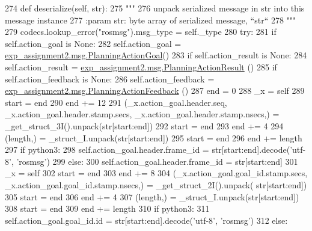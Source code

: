 \begin{DoxyCode}
274   \textcolor{keyword}{def }deserialize(self, str):
275     \textcolor{stringliteral}{"""}
276 \textcolor{stringliteral}{    unpack serialized message in str into this message instance}
277 \textcolor{stringliteral}{    :param str: byte array of serialized message, ``str``}
278 \textcolor{stringliteral}{    """}
279     codecs.lookup\_error(\textcolor{stringliteral}{"rosmsg"}).msg\_type = self.\_type
280     \textcolor{keywordflow}{try}:
281       \textcolor{keywordflow}{if} self.action\_goal \textcolor{keywordflow}{is} \textcolor{keywordtype}{None}:
282         self.action\_goal = \hyperlink{classexp__assignment2_1_1msg_1_1__PlanningActionGoal_1_1PlanningActionGoal}{exp\_assignment2.msg.PlanningActionGoal}()
283       \textcolor{keywordflow}{if} self.action\_result \textcolor{keywordflow}{is} \textcolor{keywordtype}{None}:
284         self.action\_result = \hyperlink{classexp__assignment2_1_1msg_1_1__PlanningActionResult_1_1PlanningActionResult}{exp\_assignment2.msg.PlanningActionResult}
      ()
285       \textcolor{keywordflow}{if} self.action\_feedback \textcolor{keywordflow}{is} \textcolor{keywordtype}{None}:
286         self.action\_feedback = \hyperlink{classexp__assignment2_1_1msg_1_1__PlanningActionFeedback_1_1PlanningActionFeedback}{exp\_assignment2.msg.PlanningActionFeedback}
      ()
287       end = 0
288       \_x = self
289       start = end
290       end += 12
291       (\_x.action\_goal.header.seq, \_x.action\_goal.header.stamp.secs, \_x.action\_goal.header.stamp.nsecs,) = 
      \_get\_struct\_3I().unpack(str[start:end])
292       start = end
293       end += 4
294       (length,) = \_struct\_I.unpack(str[start:end])
295       start = end
296       end += length
297       \textcolor{keywordflow}{if} python3:
298         self.action\_goal.header.frame\_id = str[start:end].decode(\textcolor{stringliteral}{'utf-8'}, \textcolor{stringliteral}{'rosmsg'})
299       \textcolor{keywordflow}{else}:
300         self.action\_goal.header.frame\_id = str[start:end]
301       \_x = self
302       start = end
303       end += 8
304       (\_x.action\_goal.goal\_id.stamp.secs, \_x.action\_goal.goal\_id.stamp.nsecs,) = \_get\_struct\_2I().unpack(
      str[start:end])
305       start = end
306       end += 4
307       (length,) = \_struct\_I.unpack(str[start:end])
308       start = end
309       end += length
310       \textcolor{keywordflow}{if} python3:
311         self.action\_goal.goal\_id.id = str[start:end].decode(\textcolor{stringliteral}{'utf-8'}, \textcolor{stringliteral}{'rosmsg'})
312       \textcolor{keywordflow}{else}:

\end{DoxyCode}
